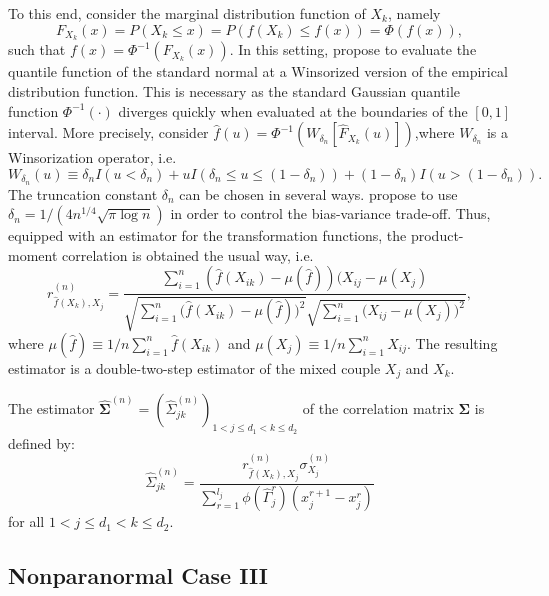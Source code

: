 To this end, consider the marginal distribution function of $X_k$, namely \[F_{X_k}(x)=P(X_k \leq x) = P(f(X_k) \leq f(x)) = \Phi(f(x)),\] such that $f(x) = \Phi^{-1}(F_{X_k}(x))$. In this setting, \citet{Liu09} propose to evaluate the quantile function of the standard normal at a Winsorized version of the empirical distribution function. This is necessary as the standard Gaussian quantile function $\Phi^{-1}(\cdot)$ diverges quickly when evaluated at the boundaries of the $[0,1]$ interval. More precisely, consider $\hat{f}(u) = \Phi^{-1}(W_{\delta_n}[\hat{F}_{X_k}(u)])$,where $W_{\delta_n}$ is a Winsorization operator, i.e. \[W_{\delta_n}(u) \equiv \delta_n I(u < \delta_n) + u I(\delta_n \leq u \leq (1-\delta_n)) + (1-\delta_n) I(u > (1-\delta_n)).\] The truncation constant $\delta_n$ can be chosen in several ways.
\citet{Liu09} propose to use $\delta_n = 1/(4n^{1/4}\sqrt{\pi\log n})$ in order to control the bias-variance trade-off. Thus, equipped with an estimator for the transformation functions, the product-moment correlation is obtained the usual way, i.e.
\begin{equation*}
    r^{(n)}_{\hat{f}(X_k),X_j} = \frac{\sum_{i=1}^n (\hat{f}(X_{ik}) - \mu(\hat{f}))(X_{ij} - \mu(X_j)}{\sqrt{\sum_{i=1}^n \Big(\hat{f}(X_{ik}) - \mu(\hat{f})\Big)^2}\sqrt{\sum_{i=1}^n \Big(X_{ij} - \mu(X_j)\Big)^2}},
\end{equation*}
where $\mu(\hat{f}) \equiv 1/n\sum_{i=1}^n \hat{f}(X_{ik})$ and $\mu(X_j) \equiv 1/n\sum_{i=1}^n X_{ij}$. The resulting estimator is a double-two-step estimator of the mixed couple $X_j$ and $X_k$.
\begin{definition}
    The estimator $\hat{\mathbf{\Sigma}}^{(n)} = (\hat{\Sigma}_{jk}^{(n)})_{1 < j \leq d_1 < k \leq d_2}$ of the correlation matrix $\mathbf{\Sigma}$ is defined by:
\begin{equation}
    \hat{\Sigma}_{jk}^{(n)} = \frac{r^{(n)}_{\hat{f}(X_k),X_j} \sigma^{(n)}_{X_j}}{\sum_{r=1}^{l_{j}} \phi(\hat{\Gamma}_j^r)(x_j^{r+1} - x_j^r)}
\end{equation}
    for all $1 < j \leq d_1 < k \leq d_2$.
\end{definition}



\subsection{Nonparanormal Case III}\label{sec::nonparanormal_case3} 

